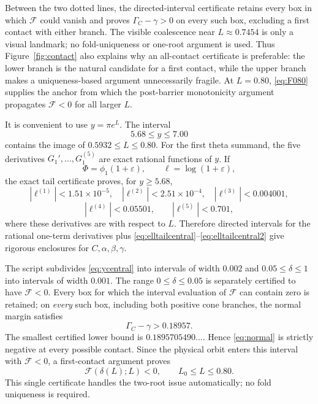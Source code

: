 \documentclass{amsart}
\numberwithin{equation}{section}
\theoremstyle{definition}
\theoremstyle{remark}
\newcommand{\Fcal}{\mathcal F}
\begin{document}
Between the two dotted lines, the directed-interval certificate retains every box in which $\Fcal$ could vanish and proves $\Gamma_C-\gamma>0$ on every such box, excluding a first contact with either branch.  The visible coalescence near $L\approx0.7454$ is only a visual landmark; no fold-uniqueness or one-root argument is used.  Thus Figure~\ref{fig:contact} also explains why an all-contact certificate is preferable: the lower branch is the natural candidate for a first contact, while the upper branch makes a uniqueness-based argument unnecessarily fragile.  At $L=0.80$, \eqref{eq:F080} supplies the anchor from which the post-barrier monotonicity argument propagates $\Fcal<0$ for all larger $L$.


It is convenient to use $y=\pi e^L$.  The interval
\begin{equation}\label{eq:ycentral}
 5.68\le y\le7.00
\end{equation}
contains the image of $0.5932\le L\le0.80$.  For the first theta summand, the five derivatives $G_1',\ldots,G_1^{(5)}$ are exact rational functions of $y$.  If
\[
 \Phi=\phi_1(1+\varepsilon),\qquad \ell=\log(1+\varepsilon),
\]
the exact tail certificate  proves, for $y\ge5.68$,
\begin{equation}\label{eq:elltailcentral}
 |\ell^{(1)}|<1.51\!\times10^{-5},\quad
 |\ell^{(2)}|<2.51\!\times10^{-4},\quad
 |\ell^{(3)}|<0.004001,
\end{equation}
\begin{equation}\label{eq:elltailcentral2}
 |\ell^{(4)}|<0.05501,\qquad
 |\ell^{(5)}|<0.701,
\end{equation}
where these derivatives are with respect to $L$.  Therefore directed intervals for the rational one-term derivatives plus \eqref{eq:elltailcentral}--\eqref{eq:elltailcentral2} give rigorous enclosures for $C,\alpha,\beta,\gamma$.

The script  subdivides \eqref{eq:ycentral} into intervals of width $0.002$ and $0.05\le\delta\le1$ into intervals of width $0.001$.  The range $0\le\delta\le0.05$ is separately certified to have $\Fcal<0$.  Every box for which the interval evaluation of $\Fcal$ can contain zero is retained; on \emph{every} such box, including both positive cone branches, the normal margin satisfies
\begin{equation}\label{eq:margincone}
 \boxed{\qquad \Gamma_C-\gamma>0.18957.\qquad}
\end{equation}
The smallest certified lower bound is $0.1895705490\ldots$.  Hence \eqref{eq:normal} is strictly negative at every possible contact.  Since the physical orbit enters this interval with $\Fcal<0$, a first-contact argument proves
\begin{equation}\label{eq:Fto080}
 \Fcal(\delta(L);L)<0,
 \qquad L_0\le L\le0.80.
\end{equation}
This single certificate handles the two-root issue automatically; no fold uniqueness is required.
\end{document}
